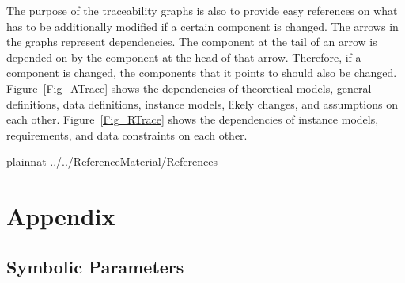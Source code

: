 \documentclass[12pt]{article}
\begin{document}
The purpose of the traceability graphs is also to provide easy references on
what has to be additionally modified if a certain component is changed.  The
arrows in the graphs represent dependencies. The component at the tail of an
arrow is depended on by the component at the head of that arrow. Therefore, if a
component is changed, the components that it points to should also be
changed. Figure~\ref{Fig_ATrace} shows the dependencies of theoretical models,
general definitions, data definitions, instance models, likely changes, and
assumptions on each other. Figure~\ref{Fig_RTrace} shows the dependencies of
instance models, requirements, and data constraints on each other.



\newpage

 {plainnat}
 {../../ReferenceMaterial/References}

\newpage

\section{Appendix}


\subsection{Symbolic Parameters}

\end{document}
